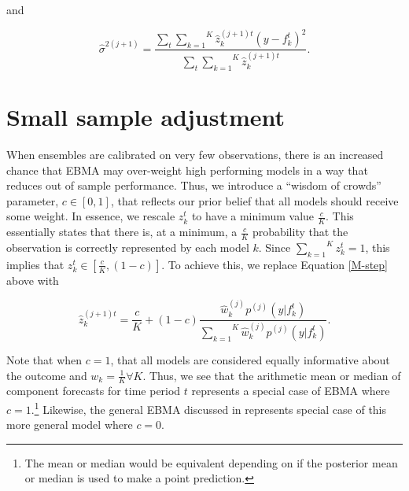\documentclass[12pt,fullpage,endnotes]{article}
\begin{document}
\noindent and

\begin{equation}
\hat{\sigma}^{2(j+1)}=\frac{\underset{t}{\sum}\overset{K}{\underset{k=1}{\sum}}\hat{z}^{(j+1)t}_{k}(y-f_{k}^{t})^2 }{\underset{t}{\sum}\overset{K}{\underset{k=1}{ \sum}} \hat{z}_k^{(j+1)t}}.
\end{equation}



\section{Small sample adjustment}
\label{woc}

When ensembles are calibrated on very few observations, there is an
increased chance that EBMA may over-weight high performing models in a
way that reduces out of sample performance.  Thus, we introduce a
``wisdom of crowds'' parameter, $c \in [0,1]$, that reflects our prior
belief that all models should receive some weight.  In essence, we
rescale $z^t_k$ to have a minimum value $\frac{c}{K}$.  This
essentially states that there is, at a minimum, a $\frac{c}{K}$
probability that the observation is correctly represented by each
model $k$.  Since $\overset{K}{\underset{k=1}{\sum}} z_k^t = 1$, this
implies that $z_k^t \in [\frac{c}{K}, (1-c)]$.  To achieve this, we
replace Equation \ref{M-step} above with

\begin{equation}
\hat{z}^{(j+1)t}_{k} = \frac{c}{K} + (1-c)\frac{\hat{w}^{(j)}_k
p^{(j)}(y|f_{k}^{t})}{\overset{K}{\underset{k=1}{\sum}}\hat{w}^{(j)}_kp^{(j)}(y|f_{k}^{t})}.
\end{equation}




Note that when $c=1$, that all models are considered equally
informative about the outcome and $w_k=\frac{1}{K} \forall K$. Thus, we see that the arithmetic mean or
median of component forecasts for time period $t$ represents a special
case of EBMA where $c=1$.\footnote{The mean or median would be
  equivalent depending on if the posterior mean or median is used to
  make a point prediction.}  Likewise, the general EBMA discussed in
\citet{Montgomery:2012} represents special case of this more general
model where $c=0$.
\end{document}
